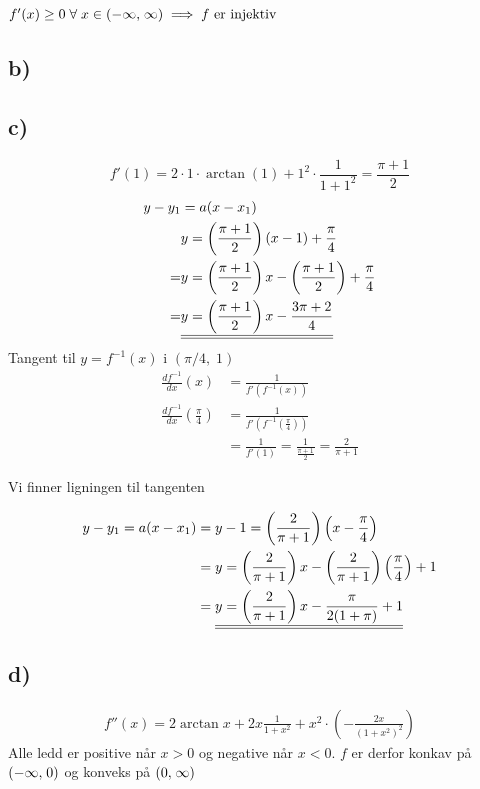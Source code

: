 \documentclass{article}
\begin{document}
$f'(x) \ge 0 \;\forall\; x \in \interval({-\infty,\;\infty}) \implies f \text{ er injektiv}$

\subsection*{b)}
\subsection*{c)}

$$f'(1) = 2\cdot1\cdot \arctan(1) + 1^2 \cdot \frac{1}{1+1^2}=\frac{\pi+1}{2}$$
\begin{align*}
	y-y_1 &= a(x-x_1)\\
	&y = \left(\frac{\pi+1}{2}\right) (x-1) + \frac{\pi}{4}\\
	=&y= \left(\frac{\pi+1}{2}\right) x - \left(\frac{\pi+1}{2}\right) + \frac{\pi}{4}\\
	=&\underline{\underline{y= \left(\frac{\pi+1}{2}\right) x - \frac{3\pi+2}{4}}}
\end{align*}
Tangent til $y=f^{-1}(x)$ i $(\pi/4,\;1)$
\begin{align*}
\frac{d f^{-1}}{dx} (x) &= \frac{1}{f'(f^{-1}(x))}\\
\frac{d f^{-1}}{dx} \left(\frac{\pi}{4}\right) &= \frac{1}{f'(f^{-1}(\frac{\pi}{4}))}\\
&= \frac{1}{f'(1)} = \frac{1}{\frac{\pi+1}{2}}= \frac{2}{\pi+1}
\end{align*}

Vi finner ligningen til tangenten

\begin{align*}
		y-y_1 = a(x-x_1) &= y - 1 = \left(\frac{2}{\pi+1}\right)\left(x-\frac{\pi}{4}\right)\\
		&= y = \left(\frac{2}{\pi+1}\right) x - \left(\frac{2}{\pi+1}\right) \left(\frac{\pi}{4}\right) + 1\\
		&= \underline{\underline{y = \left(\frac{2}{\pi+1}\right) x - \frac{\pi}{2(1+\pi)} + 1}}
\end{align*}

\subsection*{d)}
\begin{align*}
	f''(x) = 2 \arctan x + 2x \frac{1}{1+x^2} + x^2 \cdot \left(-\frac{2x}{(1+x^2)^2}\right)
\end{align*}
Alle ledd er positive når $x>0$ og negative når $x<0$. $f$ er derfor konkav på $\interval({-\infty,\;0})$ og konveks på $\interval({0,\;\infty})$
\end{document}
